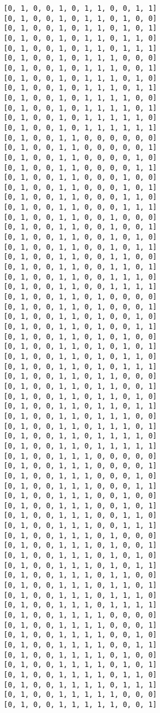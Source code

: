 \documentclass[11pt]{article}
\begin{document}
\begin{Verbatim}[commandchars=\\\{\}]
[0, 1, 0, 0, 1, 0, 1, 1, 0, 0, 1, 1]
[0, 1, 0, 0, 1, 0, 1, 1, 0, 1, 0, 0]
[0, 1, 0, 0, 1, 0, 1, 1, 0, 1, 0, 1]
[0, 1, 0, 0, 1, 0, 1, 1, 0, 1, 1, 0]
[0, 1, 0, 0, 1, 0, 1, 1, 0, 1, 1, 1]
[0, 1, 0, 0, 1, 0, 1, 1, 1, 0, 0, 0]
[0, 1, 0, 0, 1, 0, 1, 1, 1, 0, 0, 1]
[0, 1, 0, 0, 1, 0, 1, 1, 1, 0, 1, 0]
[0, 1, 0, 0, 1, 0, 1, 1, 1, 0, 1, 1]
[0, 1, 0, 0, 1, 0, 1, 1, 1, 1, 0, 0]
[0, 1, 0, 0, 1, 0, 1, 1, 1, 1, 0, 1]
[0, 1, 0, 0, 1, 0, 1, 1, 1, 1, 1, 0]
[0, 1, 0, 0, 1, 0, 1, 1, 1, 1, 1, 1]
[0, 1, 0, 0, 1, 1, 0, 0, 0, 0, 0, 0]
[0, 1, 0, 0, 1, 1, 0, 0, 0, 0, 0, 1]
[0, 1, 0, 0, 1, 1, 0, 0, 0, 0, 1, 0]
[0, 1, 0, 0, 1, 1, 0, 0, 0, 0, 1, 1]
[0, 1, 0, 0, 1, 1, 0, 0, 0, 1, 0, 0]
[0, 1, 0, 0, 1, 1, 0, 0, 0, 1, 0, 1]
[0, 1, 0, 0, 1, 1, 0, 0, 0, 1, 1, 0]
[0, 1, 0, 0, 1, 1, 0, 0, 0, 1, 1, 1]
[0, 1, 0, 0, 1, 1, 0, 0, 1, 0, 0, 0]
[0, 1, 0, 0, 1, 1, 0, 0, 1, 0, 0, 1]
[0, 1, 0, 0, 1, 1, 0, 0, 1, 0, 1, 0]
[0, 1, 0, 0, 1, 1, 0, 0, 1, 0, 1, 1]
[0, 1, 0, 0, 1, 1, 0, 0, 1, 1, 0, 0]
[0, 1, 0, 0, 1, 1, 0, 0, 1, 1, 0, 1]
[0, 1, 0, 0, 1, 1, 0, 0, 1, 1, 1, 0]
[0, 1, 0, 0, 1, 1, 0, 0, 1, 1, 1, 1]
[0, 1, 0, 0, 1, 1, 0, 1, 0, 0, 0, 0]
[0, 1, 0, 0, 1, 1, 0, 1, 0, 0, 0, 1]
[0, 1, 0, 0, 1, 1, 0, 1, 0, 0, 1, 0]
[0, 1, 0, 0, 1, 1, 0, 1, 0, 0, 1, 1]
[0, 1, 0, 0, 1, 1, 0, 1, 0, 1, 0, 0]
[0, 1, 0, 0, 1, 1, 0, 1, 0, 1, 0, 1]
[0, 1, 0, 0, 1, 1, 0, 1, 0, 1, 1, 0]
[0, 1, 0, 0, 1, 1, 0, 1, 0, 1, 1, 1]
[0, 1, 0, 0, 1, 1, 0, 1, 1, 0, 0, 0]
[0, 1, 0, 0, 1, 1, 0, 1, 1, 0, 0, 1]
[0, 1, 0, 0, 1, 1, 0, 1, 1, 0, 1, 0]
[0, 1, 0, 0, 1, 1, 0, 1, 1, 0, 1, 1]
[0, 1, 0, 0, 1, 1, 0, 1, 1, 1, 0, 0]
[0, 1, 0, 0, 1, 1, 0, 1, 1, 1, 0, 1]
[0, 1, 0, 0, 1, 1, 0, 1, 1, 1, 1, 0]
[0, 1, 0, 0, 1, 1, 0, 1, 1, 1, 1, 1]
[0, 1, 0, 0, 1, 1, 1, 0, 0, 0, 0, 0]
[0, 1, 0, 0, 1, 1, 1, 0, 0, 0, 0, 1]
[0, 1, 0, 0, 1, 1, 1, 0, 0, 0, 1, 0]
[0, 1, 0, 0, 1, 1, 1, 0, 0, 0, 1, 1]
[0, 1, 0, 0, 1, 1, 1, 0, 0, 1, 0, 0]
[0, 1, 0, 0, 1, 1, 1, 0, 0, 1, 0, 1]
[0, 1, 0, 0, 1, 1, 1, 0, 0, 1, 1, 0]
[0, 1, 0, 0, 1, 1, 1, 0, 0, 1, 1, 1]
[0, 1, 0, 0, 1, 1, 1, 0, 1, 0, 0, 0]
[0, 1, 0, 0, 1, 1, 1, 0, 1, 0, 0, 1]
[0, 1, 0, 0, 1, 1, 1, 0, 1, 0, 1, 0]
[0, 1, 0, 0, 1, 1, 1, 0, 1, 0, 1, 1]
[0, 1, 0, 0, 1, 1, 1, 0, 1, 1, 0, 0]
[0, 1, 0, 0, 1, 1, 1, 0, 1, 1, 0, 1]
[0, 1, 0, 0, 1, 1, 1, 0, 1, 1, 1, 0]
[0, 1, 0, 0, 1, 1, 1, 0, 1, 1, 1, 1]
[0, 1, 0, 0, 1, 1, 1, 1, 0, 0, 0, 0]
[0, 1, 0, 0, 1, 1, 1, 1, 0, 0, 0, 1]
[0, 1, 0, 0, 1, 1, 1, 1, 0, 0, 1, 0]
[0, 1, 0, 0, 1, 1, 1, 1, 0, 0, 1, 1]
[0, 1, 0, 0, 1, 1, 1, 1, 0, 1, 0, 0]
[0, 1, 0, 0, 1, 1, 1, 1, 0, 1, 0, 1]
[0, 1, 0, 0, 1, 1, 1, 1, 0, 1, 1, 0]
[0, 1, 0, 0, 1, 1, 1, 1, 0, 1, 1, 1]
[0, 1, 0, 0, 1, 1, 1, 1, 1, 0, 0, 0]
[0, 1, 0, 0, 1, 1, 1, 1, 1, 0, 0, 1]

\end{Verbatim}
\end{document}
